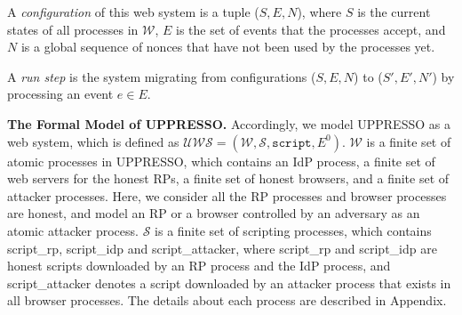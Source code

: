 \noindent A {\em configuration} of this web system is a tuple ($S, E, N$), where $S$ is the current states of all processes in $\mathcal{W}$, $E$ is the set of events that the processes accept, and $N$ is a global sequence of nonces that have not been used by the processes yet.

\noindent A {\em run step} is the system migrating from configurations ($S, E, N$) to ($S', E', N'$) by processing an event $e \in E$.

\noindent\textbf{The Formal Model of UPPRESSO.}
Accordingly, we model UPPRESSO as a web system, which is defined as $\mathcal{UWS} = (\mathcal{W}, \mathcal{S}, \mathtt{script}, E^0)$. $\mathcal{W}$ is a finite set of atomic processes in UPPRESSO, which contains an IdP process, a finite set of web servers for the honest RPs, a finite set of honest browsers, and a finite set of attacker processes. Here, we consider all the RP processes and browser processes are honest, and model an RP or a browser controlled by an adversary as an atomic attacker process.
$\mathcal{S}$ is a finite set of scripting processes, which contains {\sf script\_rp}, {\sf script\_idp} and {\sf script\_attacker}, where {\sf script\_rp} and {\sf script\_idp} are honest scripts downloaded by an RP process and the IdP process, and {\sf script\_attacker} denotes a script downloaded by an attacker process that exists in all browser processes.
The details about each process are described in Appendix.
